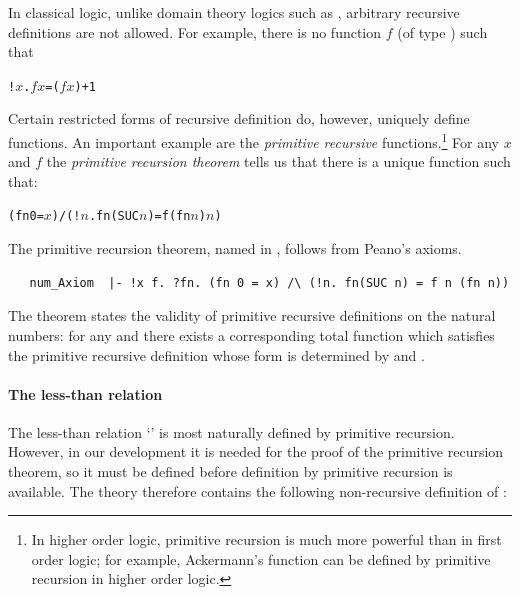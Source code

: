 In classical logic, unlike domain theory logics such as \PPL,
%
%
arbitrary recursive definitions
%
%
are not allowed. For example, there is no function $f$ (of type
) such that

\begin{alltt}
   !\(x\). \(f\) \(x\) = (\(f\) \(x\)) + 1
\end{alltt}
Certain restricted forms of recursive
%
%
definition do, however, uniquely define functions. An important
example are the \emph{primitive recursive} functions.\footnote{In
  higher order logic, primitive recursion is much more powerful than
  in first order logic; for example, Ackermann's function can be
  defined by primitive recursion in higher order logic.} For any $x$
and $f$ the \emph{primitive recursion theorem} tells us that there is
a unique function  such that:

\begin{alltt}
   (fn 0 = \(x\)) /\bs (!\(n\). fn(SUC \(n\)) = f (fn \(n\)) \(n\))
\end{alltt}

The primitive recursion theorem, named  in \HOL,
follows from Peano's
%
%
axioms.

\begin{hol}
\begin{verbatim}
   num_Axiom  |- !x f. ?fn. (fn 0 = x) /\ (!n. fn(SUC n) = f n (fn n))
\end{verbatim}
\end{hol}

\noindent The theorem states the validity of primitive recursive
definitions on the natural numbers: for any  and  there exists a
corresponding total function  which satisfies
the primitive recursive definition whose form is determined by  and
.

\paragraph{The less-than relation}

The less-than relation `\holtxt{<}'
is most naturally defined by primitive recursion. However, in our
development it is needed for the proof of the
  primitive recursion theorem, so it must be defined before definition
  by primitive recursion is available. The theory 
  therefore contains the following non-recursive definition of \ml{<}:

